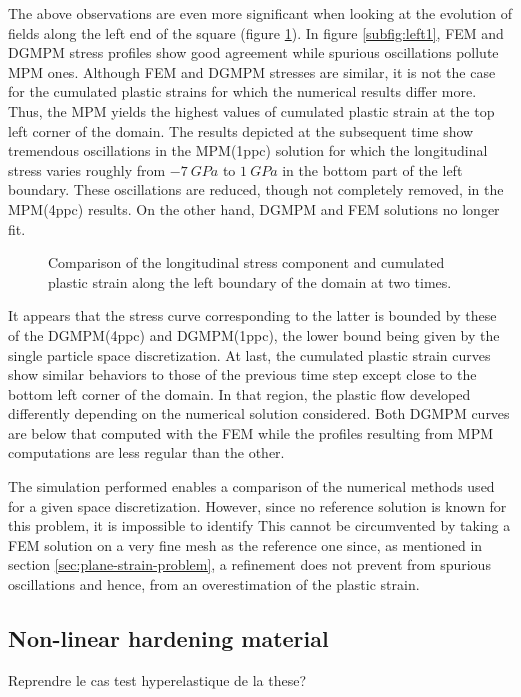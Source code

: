 The above observations are even more significant when looking at the evolution of fields along the left end of the square (figure \ref{fig:left_line}).
In figure \ref{subfig:left1}, FEM and DGMPM stress profiles show good agreement while spurious oscillations pollute MPM ones. 
Although FEM and DGMPM stresses are similar, it is not the case for the cumulated plastic strains for which the numerical results differ more.
Thus, the MPM yields the highest values of cumulated plastic strain at the top left corner of the domain.
The results depicted at the subsequent time show tremendous oscillations in the MPM(1ppc) solution for which the longitudinal stress varies roughly from $-7 \: GPa$ to $1 \: GPa$ in the bottom part of the left boundary.
These oscillations are reduced, though not completely removed, in the MPM(4ppc) results. 
On the other hand, DGMPM and FEM solutions no longer fit.
\begin{figure}[ht]
  \centering
  {}
  {}
  
  \caption{Comparison of the longitudinal stress component and cumulated plastic strain along the left boundary of the domain at two times.}
  \label{fig:left_line}
\end{figure}
It appears that the stress curve corresponding to the latter is bounded by these of the DGMPM(4ppc) and DGMPM(1ppc), the lower bound being given by the single particle space discretization.
At last, the cumulated plastic strain curves show similar behaviors to those of the previous time step except close to the bottom left corner of the domain.
In that region, the plastic flow developed differently depending on the numerical solution considered.
Both DGMPM curves are below that computed with the FEM while the profiles resulting from MPM computations are less regular than the other.

The simulation performed enables a comparison of the numerical methods used for a given space discretization.
However, since no reference solution is known for this problem, it is impossible to identify 
This cannot be circumvented by taking a FEM solution on a very fine mesh as the reference one since, as mentioned in section \ref{sec:plane-strain-problem}, a refinement does not prevent from spurious oscillations and hence, from an overestimation of the plastic strain.

\subsection{Non-linear hardening material}
\label{sec:non-linear-hardening}
Reprendre le cas test hyperelastique de la these?


